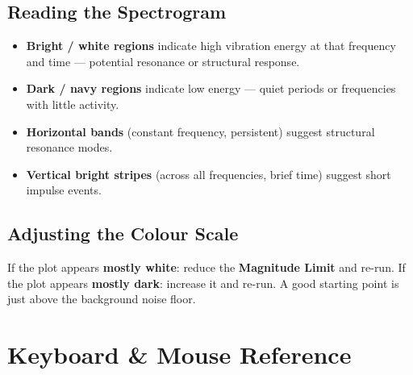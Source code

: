 \documentclass[12pt, a4paper]{article}
\begin{document}
\subsection{Reading the Spectrogram}

\begin{itemize}
  \item \textbf{Bright / white regions} indicate high vibration energy at
        that frequency and time — potential resonance or structural response.
  \item \textbf{Dark / navy regions} indicate low energy — quiet periods or
        frequencies with little activity.
  \item \textbf{Horizontal bands} (constant frequency, persistent) suggest
        structural resonance modes.
  \item \textbf{Vertical bright stripes} (across all frequencies, brief time)
        suggest short impulse events.
\end{itemize}

\subsection{Adjusting the Colour Scale}

If the plot appears \textbf{mostly white}: reduce the \textbf{Magnitude Limit}
and re-run.  If the plot appears \textbf{mostly dark}: increase it and re-run.
A good starting point is just above the background noise floor.

\section{Keyboard \& Mouse Reference}
\end{document}
